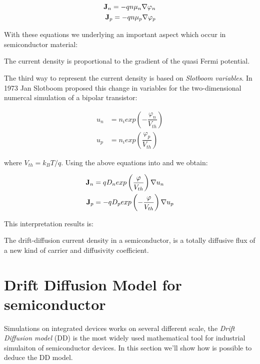\begin{align}
\mathbf{J}_n = -qn\mu_n\nabla \varphi_n \\
\mathbf{J}_p = -qn\mu_p\nabla \varphi_p 
\end{align}

With these equations we underlying an important aspect which occur in semiconductor material:
\begin{Osservazione}
The current density is proportional to the gradient of the quasi Fermi potential.
\end{Osservazione}

The third way to represent the current density is based on \textit{Slotboom variables}. In 1973 Jan Slotboom proposed this change in variables for the two-dimensional numercal simulation of a bipolar transistor:

\begin{align}
u_n &= n_iexp\left(-\dfrac{\varphi_n}{V_{th}} \right) \label{eq: un slotboom} \\
u_p &= n_iexp\left(\dfrac{\varphi_p}{V_{th}} \right) \label{eq: up slotboom} 
\end{align}

where $V_{th}=k_BT/q$. Using the above equations into  and  we obtain:

\begin{align}
\mathbf{J}_n &= qD_n exp\left(\dfrac{\varphi}{V_{th}}\right) \nabla u_n \\
\mathbf{J}_p &= -qD_p exp\left(-\dfrac{\varphi}{V_{th}}\right)  \nabla u_p 
\end{align}

This interpretation results is:
\begin{Osservazione}
The drift-diffusion current density in a semiconductor, is a totally diffusive flux of a new kind of carrier and diffusivity coefficient. 
\end{Osservazione}


\section{Drift Diffusion Model for semiconductor}
\label{section: dd model for semi}

Simulations on integrated devices works on several different scale, the \textit{Drift Diffusion model} (DD) is the most widely used mathematical tool for industrial simulaiton of semiconductor devices. In this section we'll show how is possible to deduce the DD model.

